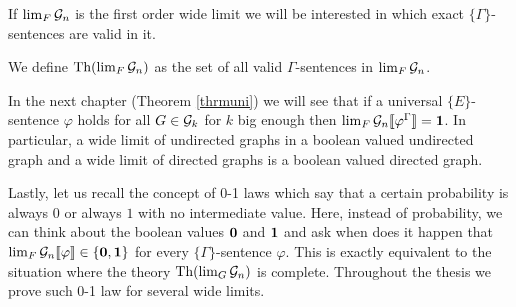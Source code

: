 If $\lim_F\mathcal{G}_n$ is the first order wide limit we will be interested in which exact $\{\Gamma\}$-sentences are valid in it.

\begin{defi}
We define $\text{Th}(\lim_F\mathcal{G}_n)$ as the set of all valid $\Gamma$-sentences in $\lim_{F}\mathcal{G}_n$.
\end{defi}

In the next chapter (Theorem \ref{thrmuni}) we will see that if a universal $\{E\}$-sentence $\varphi$ holds for all $G\in\mathcal{G}_k$ for $k$ big enough then $\lim_F\mathcal{G}_n\llbracket\varphi^\Gamma\rrbracket=\textbf{1}$. In particular, a wide limit of undirected graphs in a boolean valued undirected graph and a wide limit of directed graphs is a boolean valued directed graph.

Lastly, let us recall the concept of 0-1 laws which say that a certain probability is always $0$ or always $1$ with no intermediate value. Here, instead of probability, we can think about the boolean values $\textbf{0}$ and $\textbf{1}$ and ask when does it happen that $\lim_F\mathcal{G}_n\llbracket\varphi\rrbracket\in\{\textbf{0},\textbf{1}\}$ for every $\{\Gamma\}$-sentence $\varphi$. This is exactly equivalent to the situation where the theory $\text{Th}(\lim_G \mathcal{G}_n)$ is complete. Throughout the thesis we prove such 0-1 law for several wide limits.
